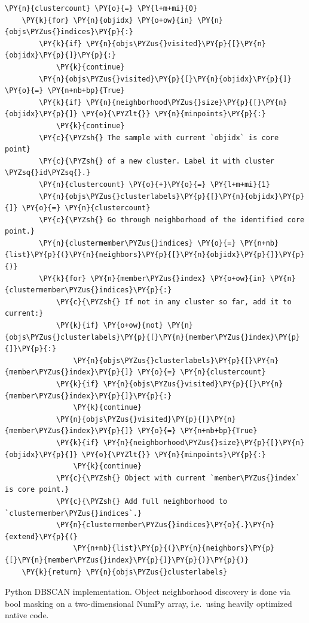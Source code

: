 \begin{listing}
\begin{Verbatim}[fontsize=\tiny,commandchars=\\\{\}]
    \PY{n}{clustercount} \PY{o}{=} \PY{l+m+mi}{0}
    \PY{k}{for} \PY{n}{objidx} \PY{o+ow}{in} \PY{n}{objs\PYZus{}indices}\PY{p}{:}
        \PY{k}{if} \PY{n}{objs\PYZus{}visited}\PY{p}{[}\PY{n}{objidx}\PY{p}{]}\PY{p}{:}
            \PY{k}{continue}
        \PY{n}{objs\PYZus{}visited}\PY{p}{[}\PY{n}{objidx}\PY{p}{]} \PY{o}{=} \PY{n+nb+bp}{True}
        \PY{k}{if} \PY{n}{neighborhood\PYZus{}size}\PY{p}{[}\PY{n}{objidx}\PY{p}{]} \PY{o}{\PYZlt{}} \PY{n}{minpoints}\PY{p}{:}
            \PY{k}{continue}
        \PY{c}{\PYZsh{} The sample with current `objidx` is core point}
        \PY{c}{\PYZsh{} of a new cluster. Label it with cluster \PYZsq{}id\PYZsq{}.}
        \PY{n}{clustercount} \PY{o}{+}\PY{o}{=} \PY{l+m+mi}{1}
        \PY{n}{objs\PYZus{}clusterlabels}\PY{p}{[}\PY{n}{objidx}\PY{p}{]} \PY{o}{=} \PY{n}{clustercount}
        \PY{c}{\PYZsh{} Go through neighborhood of the identified core point.}
        \PY{n}{clustermember\PYZus{}indices} \PY{o}{=} \PY{n+nb}{list}\PY{p}{(}\PY{n}{neighbors}\PY{p}{[}\PY{n}{objidx}\PY{p}{]}\PY{p}{)}
        \PY{k}{for} \PY{n}{member\PYZus{}index} \PY{o+ow}{in} \PY{n}{clustermember\PYZus{}indices}\PY{p}{:}
            \PY{c}{\PYZsh{} If not in any cluster so far, add it to current:}
            \PY{k}{if} \PY{o+ow}{not} \PY{n}{objs\PYZus{}clusterlabels}\PY{p}{[}\PY{n}{member\PYZus{}index}\PY{p}{]}\PY{p}{:}
                \PY{n}{objs\PYZus{}clusterlabels}\PY{p}{[}\PY{n}{member\PYZus{}index}\PY{p}{]} \PY{o}{=} \PY{n}{clustercount}
            \PY{k}{if} \PY{n}{objs\PYZus{}visited}\PY{p}{[}\PY{n}{member\PYZus{}index}\PY{p}{]}\PY{p}{:}
                \PY{k}{continue}
            \PY{n}{objs\PYZus{}visited}\PY{p}{[}\PY{n}{member\PYZus{}index}\PY{p}{]} \PY{o}{=} \PY{n+nb+bp}{True}
            \PY{k}{if} \PY{n}{neighborhood\PYZus{}size}\PY{p}{[}\PY{n}{objidx}\PY{p}{]} \PY{o}{\PYZlt{}} \PY{n}{minpoints}\PY{p}{:}
                \PY{k}{continue}
            \PY{c}{\PYZsh{} Object with current `member\PYZus{}index` is core point.}
            \PY{c}{\PYZsh{} Add full neighborhood to `clustermember\PYZus{}indices`.}
            \PY{n}{clustermember\PYZus{}indices}\PY{o}{.}\PY{n}{extend}\PY{p}{(}
                \PY{n+nb}{list}\PY{p}{(}\PY{n}{neighbors}\PY{p}{[}\PY{n}{member\PYZus{}index}\PY{p}{]}\PY{p}{)}\PY{p}{)}
    \PY{k}{return} \PY{n}{objs\PYZus{}clusterlabels}
\end{Verbatim}
\caption{
Python DBSCAN implementation. Object neighborhood discovery is done via bool
masking on a two-dimensional NumPy array, i.e.\ using heavily optimized native
code.
}
\label{listing:dbscan}
\end{listing}

